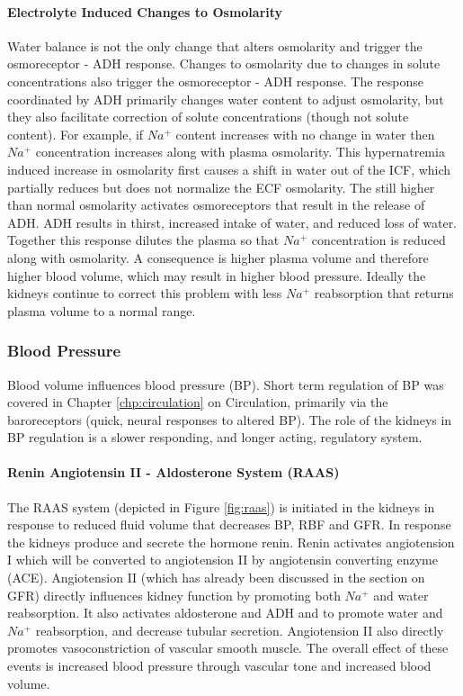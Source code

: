 \paragraph{Electrolyte Induced Changes to Osmolarity}
Water balance is not the only change that alters osmolarity and trigger the osmoreceptor - ADH response. Changes to osmolarity due to changes in solute concentrations also trigger the osmoreceptor - ADH response. The response coordinated by ADH primarily changes water content to adjust osmolarity, but they also facilitate correction of solute concentrations (though not solute content). For example, if $Na^+$ content increases with no change in water then $Na^+$ concentration increases along with plasma osmolarity. This hypernatremia induced increase in osmolarity first causes a shift in water out of the ICF, which partially reduces but does not normalize the ECF osmolarity. The still higher than normal osmolarity activates osmoreceptors that result in the release of ADH. ADH results in thirst, increased intake of water, and reduced loss of water. Together this response dilutes the plasma so that $Na^+$ concentration is reduced along with osmolarity. A consequence is higher plasma volume and therefore higher blood volume, which may result in higher blood pressure. Ideally the kidneys continue to correct this problem with less $Na^+$ reabsorption that returns plasma volume to a normal range.

\subsubsection{Blood Pressure}

Blood volume influences blood pressure (BP). Short term regulation of BP was covered in Chapter \ref{chp:circulation} on Circulation, primarily via the baroreceptors (quick, neural responses to altered BP). The role of the kidneys in BP regulation is a slower responding, and longer acting, regulatory system.

\paragraph{Renin Angiotensin II - Aldosterone System (RAAS)}

The RAAS system (depicted in Figure \ref{fig:raas}) is initiated in the kidneys in response to reduced fluid volume that decreases BP, RBF and GFR. In response the kidneys produce and secrete the hormone renin. Renin activates angiotension I which will be converted to angiotension II by angiotensin converting enzyme (ACE). Angiotension II (which has already been discussed in the section on GFR) directly influences kidney function by promoting both $Na^+$ and water reabsorption. It also activates aldosterone and ADH and to promote water and $Na^+$ reabsorption, and decrease tubular secretion. Angiotension II also directly promotes vasoconstriction of vascular smooth muscle. The overall effect of these events is increased blood pressure through vascular tone and increased blood volume.

